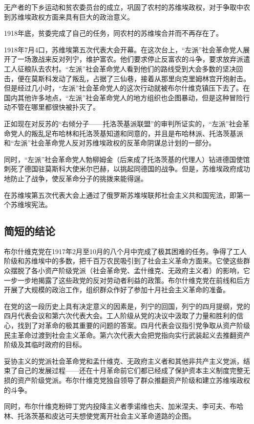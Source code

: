 无产者的下乡运动和贫农委员台的成立，巩固了农村的苏维埃政权，对于争取中农到苏维埃政权方面来具有巨大的政治意义。

1918年底，贫委完成了自己的任务，同农村的苏维埃合并而不再存在了。

1918年7月4口，苏维埃第五次代表大会开幕。在这次台上，“左派”社会革命党人展开了一场激战来反对列宁，维护富农。他们要求停止反富农的斗争，要求放弃派遣工人征粮队去农村。“左派”社会革命党人看到他们的路线受到大会多数的坚决回击，便在莫斯科发动了叛乱，占据了三仙巷，接着从那里向克里姆林宫开炮射击。但是经过几小时，“左派”社会革命党人的这次行动就被布尔什维克镇压下去了。在国内其他许多地点，“左派”社会革命党人的地方组织也企图暴动，但是这种冒险行动不管在哪里都很快被扑灭了。

正如现在对反苏的“右倾分子——托洛茨基派联盟”的审判所证实的，“左派”社会革命党人的叛乱足布哈林和托洛茨基知道和同意的，并且是布哈林派、托洛茨基派和“左派”社会革命党人反对苏维埃政权的反革命阴谋总计划的一部分。

同时，“左派”社会革命党人勃柳姆金（后来成了托洛茨基的代理人）钻进德国使馆刺死了德国驻莫斯科大使米尔巴赫，以挑起同德国的战争。但是，苏维埃政府成功地防止了战争，使反革命分子的挑拨来能得逞。

在苏维埃第五次代表大会上通过了俄罗斯苏堆埃联邦社会主义共和国宪法，即第一个苏维埃宪法。


\subsection{简短的结论}

布尔什维克党在1917年2月至10月的八个月中完成了极其困难的任务。争得了工人阶级和苏维埃中的多数，把千百万农民吸引到了社会主义革命方面来。它使这些群众摆脱了各小资产阶级党派（社会革命党、孟什维克、无政府主义者）的影响，它一步一步地揭露了这些政党的反对劳动者利益的政策。布尔什维克党在前线和后方开展了大规模的政治工作，组织群众作好了参加十月社会主义革命的准备。

在党的这一段历史上具有决定意义的因素是，列宁的回国，列宁的四月提纲，党的四月代表会议和第六次代表大会。工人阶级从党的决议中汲取了力量和胜利的信心，找到了对革命的极其重要的问题的答案。四月代表会议指引党争取从资产阶级民主革命过渡到社会主义革命。第六次代表大会把党指向实行武装起义去推翻资产阶级及其临时政府的目标。

妥协主义的党派社会革命党和孟什维克、无政府主义者和其他非共产主义党派，结束了自己的发展过程——还在十月革命前它们都已经成了保护资本主义制度完整无损的资产阶级党派。布尔什维克党独自领导了群众推翻资产阶级和建立苏维埃政权的斗争。

同时，布尔什维克粉碎丁党内投降主义者季诺维也夫、加米涅夫、李可夫、布哈林、托洛茨基和皮达可夫想使党离开社会主义革命道路的企图。

